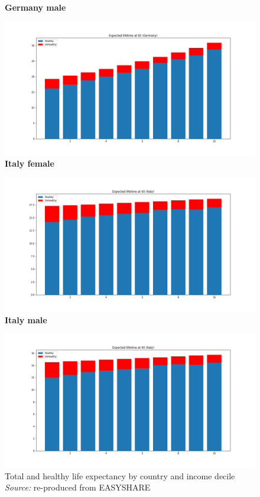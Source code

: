 \begin{figure}[H]
 \endminipage\hfill
{}
\centering \textbf{Germany male}\par\medskip
  \includegraphics[width=\linewidth]{images/new_results/Germany_1_m.png}
\endminipage\hfill
{}
\centering \textbf{Italy female}\par\medskip
  \includegraphics[width=\linewidth]{images/new_results/Italy_1_f.png}
 \endminipage\hfill
{}
\centering \textbf{Italy male}\par\medskip
  \includegraphics[width=\linewidth]{images/new_results/Italy_1_m.png}
\endminipage\hfill
\captionsetup{justification=centering}
\caption{Total and healthy life expectancy by country and income decile \\ \textit{Source:} re-produced from EASYSHARE}
\end{figure}








